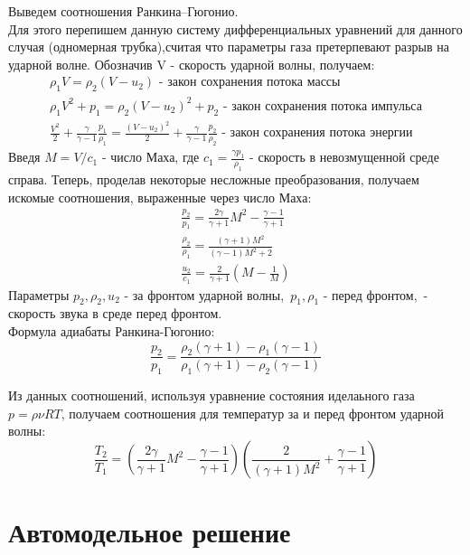 \documentclass[a4paper,12pt]{extarticle}
\begin{document}
Выведем соотношения Ранкина--Гюгонио. \\ 
Для этого перепишем данную систему дифференциальных уравнений для данного случая (одномерная трубка),считая что параметры газа претерпевают разрыв на ударной волне.
Обозначив V - скорость ударной волны, получаем:
\begin{align}
    \rho_1V = \rho_2(V-u_2) \mbox{  - закон сохранения потока массы}  \\
    \rho_1V^2 + p_1 = \rho_2(V-u_2)^2 + p_2 \mbox{  - закон сохранения потока импульса} \\
    \frac{V^2}{2}+\frac{\gamma}{\gamma-1}\frac{p_1}{\rho_1} = \frac{(V-u_2)^2}{2}+\frac{\gamma}{\gamma-1}\frac{p_2}{\rho_2} \mbox{  - закон сохранения потока энергии}
\end{align}   
Введя $M = V/c_1$ - число Маха, где $ c_1 =  \frac{\gamma p_1}{\rho_1}$ - скорость в невозмущенной среде справа.
Теперь, проделав некоторые несложные преобразования, получаем искомые соотношения, выраженные через число Маха:
\begin{align} 
    \frac{p_2}{p_1} = \frac{2\gamma}{\gamma+1}M^2-\frac{\gamma-1}{\gamma+1} \\
    \frac{\rho_2}{\rho_1} = \frac{(\gamma+1)M^2}{(\gamma-1)M^2+2} \\
    \frac{u_2}{c_1} = \frac{2}{\gamma+1}(M-\frac{1}{M})
\end{align}
Параметры $ p_2, \rho_2, u_2 $ - за фронтом ударной волны,\ $ p_1, \rho_1$ - перед фронтом,\  - скорость звука в среде перед фронтом.\\

Формула адиабаты Ранкина-Гюгонио:
$$\frac{p_2}{p_1}=\frac{\rho_2(\gamma+1)-\rho_1(\gamma-1)}{\rho_1(\gamma+1)-\rho_2(\gamma-1)}$$

Из данных соотношений, используя уравнение состояния иделаьного газа $ p =\rho \nu RT $, получаем соотношения для температур за и перед фронтом ударной волны: 
    $$\frac{T_2}{T_1} = (\frac{2\gamma }{\gamma+1}M^2-\frac{\gamma-1}{\gamma+1})(\frac{2}{(\gamma+1)M^2}+\frac{\gamma-1}{\gamma+1})$$

\section{Автомодельное решение}

\end{document}
